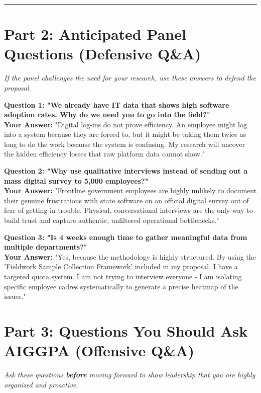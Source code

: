 \documentclass[11pt,a4paper]{article}
\begin{document}
\vspace{0.5cm}
\hrule
\vspace{0.5cm}

\section*{Part 2: Anticipated Panel Questions (Defensive Q\&A)}
\textit{If the panel challenges the need for your research, use these answers to defend the proposal.}

\vspace{0.3cm}
\textbf{Question 1: "We already have IT data that shows high software adoption rates. Why do we need you to go into the field?"} \\
\textbf{Your Answer:} "Digital log-ins do not prove efficiency. An employee might log into a system because they are forced to, but it might be taking them twice as long to do the work because the system is confusing. My research will uncover the hidden efficiency losses that raw platform data cannot show."

\vspace{0.3cm}
\textbf{Question 2: "Why use qualitative interviews instead of sending out a mass digital survey to 5,000 employees?"} \\
\textbf{Your Answer:} "Frontline government employees are highly unlikely to document their genuine frustrations with state software on an official digital survey out of fear of getting in trouble. Physical, conversational interviews are the only way to build trust and capture authentic, unfiltered operational bottlenecks."

\vspace{0.3cm}
\textbf{Question 3: "Is 4 weeks enough time to gather meaningful data from multiple departments?"} \\
\textbf{Your Answer:} "Yes, because the methodology is highly structured. By using the 'Fieldwork Sample Collection Framework' included in my proposal, I have a targeted quota system. I am not trying to interview everyone - I am isolating specific employee cadres systematically to generate a precise heatmap of the issues."

\newpage

\section*{Part 3: Questions You Should Ask AIGGPA (Offensive Q\&A)}
\textit{Ask these questions \textbf{before} moving forward to show leadership that you are highly organized and proactive.}
\end{document}
